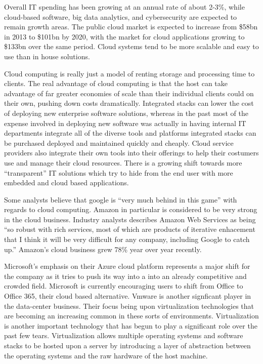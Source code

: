Overall IT spending has been growing at an annual rate of about 2-3\%, while cloud-based software, big data analytics, and cybersecurity are expected to remain growth areas.\autocite[]{CloudAnalyticsCybersecurityApplication}\autocite[]{CIOIntro}
The public cloud market is expected to increase from \$58bn in 2013 to \$101bn by 2020, with the market for cloud applications growing to \$133bn over the same period.\autocite[]{CIOIntro}
Cloud systems tend to be more scalable and easy to use than in house solutions.\autocite[]{CIOIntro}

Cloud computing is really just a model of renting storage and processing time to clients.\autocite[]{AftermathOfIntegratedStack}
The real advantage of cloud computing is that the host can take advantage of far greater economies of scale than their individual clients could on their own, pushing down costs dramatically.\autocite[]{AftermathOfIntegratedStack}
Integrated stacks can lower the cost of deploying new enterprise software solutions, whereas in the past most of the expense involved in deploying new software was actually in having internal IT departments integrate all of the diverse tools and platforms integrated stacks can be purchased deployed and maintained quickly and cheaply.\autocite[]{AftermathOfIntegratedStack}
Cloud service providers also integrate their own tools into their offerings to help their costumers use and manage their cloud resources.\autocite[]{AftermathOfIntegratedStack}
There is a growing shift towards more ``transparent'' IT solutions which try to hide from the end user with more embedded and cloud based applications.\autocite[]{OptimismInnovation}

Some analysts believe that google is ``very much behind in this game'' with regards to cloud computing.\autocite[]{GoogleCloudBoost}
Amazon in particular is considered to be very strong in the cloud business.  Industry analysts describes Amazon Web Services as being ``so robust with rich services, most of which are products of iterative enhacement that I think it will be very difficult for any company, including Google to catch up.''\autocite[]{GoogleCloudBoost}
Amazon's cloud business grew 78\% year over year recently.\autocite[]{GoogleCloudBoost}

Microsoft's emphasis on their Azure cloud platform represents a major shift for the company as it tries to push its way into a into an already competitive and crowded field.\autocite[]{OptimismInnovation}
Microsoft is currently encouraging users to shift from Office  to Office 365, their cloud based alternative.\autocite[]{NextGenBusinessSoftware}
Vmware is another signficant player in the data-center business. Their focus being upon virtualization technologies that are becoming an increasing common in these sorts of environments.\autocite[]{NextGenBusinessSoftware}
Virtualization is another important technology that has begun to play a significant role over the past few tears.\autocite[]{LargeParadigmShiftCloudComputing}
Virtualization allows multiple operating systems and software stacks to be hosted upon a server by introducing a layer of abstraction between the operating systems and the raw hardware of the host machine.\autocite[]{LargeParadigmShiftCloudComputing}

